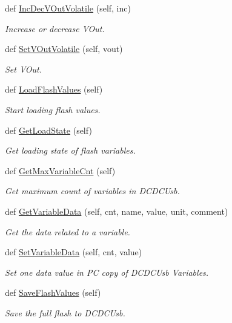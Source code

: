 \begin{DoxyCompactItemize}
def \hyperlink{class_mini_box_d_c_d_c_1_1_dc_dc_converter_1_1_dc_dc_converter_a2f9ebed6d9f31e44b7bf0a6cbd8ed495}{Inc\+Dec\+V\+Out\+Volatile} (self, inc)
\begin{DoxyCompactList}\small\item\em Increase or decrease V\+Out. \end{DoxyCompactList}\item 
def \hyperlink{class_mini_box_d_c_d_c_1_1_dc_dc_converter_1_1_dc_dc_converter_a7a8cdc0b6dd49950e9ebea4e51f72a6d}{Set\+V\+Out\+Volatile} (self, vout)
\begin{DoxyCompactList}\small\item\em Set V\+Out. \end{DoxyCompactList}\item 
def \hyperlink{class_mini_box_d_c_d_c_1_1_dc_dc_converter_1_1_dc_dc_converter_af857153e7845961b8f6a3c2f9456fc42}{Load\+Flash\+Values} (self)
\begin{DoxyCompactList}\small\item\em Start loading flash values. \end{DoxyCompactList}\item 
def \hyperlink{class_mini_box_d_c_d_c_1_1_dc_dc_converter_1_1_dc_dc_converter_a914909cd3e115e6cb503f8af8250be16}{Get\+Load\+State} (self)
\begin{DoxyCompactList}\small\item\em Get loading state of flash variables. \end{DoxyCompactList}\item 
def \hyperlink{class_mini_box_d_c_d_c_1_1_dc_dc_converter_1_1_dc_dc_converter_a8aadbb6b3b47f9e2eadee5dd063f1bbf}{Get\+Max\+Variable\+Cnt} (self)
\begin{DoxyCompactList}\small\item\em Get maximum count of variables in D\+C\+D\+C\+Usb. \end{DoxyCompactList}\item 
def \hyperlink{class_mini_box_d_c_d_c_1_1_dc_dc_converter_1_1_dc_dc_converter_acbdbf705f32cdf20fc3da544241de325}{Get\+Variable\+Data} (self, cnt, name, value, unit, comment)
\begin{DoxyCompactList}\small\item\em Get the data related to a variable. \end{DoxyCompactList}\item 
def \hyperlink{class_mini_box_d_c_d_c_1_1_dc_dc_converter_1_1_dc_dc_converter_a0340e45764fc35cdccc83da2e5e70b15}{Set\+Variable\+Data} (self, cnt, value)
\begin{DoxyCompactList}\small\item\em Set one data value in PC copy of D\+C\+D\+C\+Usb Variables. \end{DoxyCompactList}\item 
def \hyperlink{class_mini_box_d_c_d_c_1_1_dc_dc_converter_1_1_dc_dc_converter_adedbbe0014ebc27f0c5dc07a3bdddeff}{Save\+Flash\+Values} (self)
\begin{DoxyCompactList}\small\item\em Save the full flash to D\+C\+D\+C\+Usb. \end{DoxyCompactList}\end{DoxyCompactItemize}


